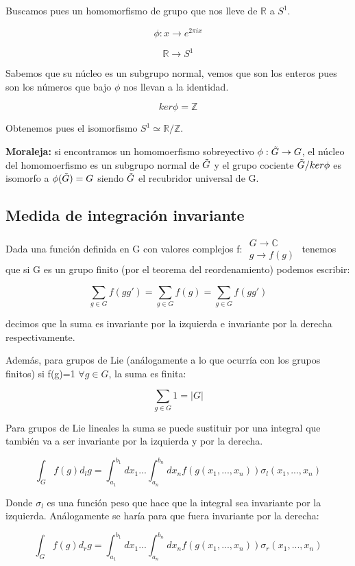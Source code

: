 \documentclass{article}
\begin{document}
\smallskip
Buscamos pues un homomorfismo de grupo que nos lleve de $\mathds{R}$ a $S^1$.

$$\phi: x \to e^{2\pi i x}$$

$$\mathds{R} \to S^1$$

Sabemos que su núcleo es un subgrupo normal, vemos que son los enteros pues son los números que bajo $\phi$ nos llevan a la identidad.

$$ker \phi = \mathds{Z}$$

Obtenemos pues el isomorfismo $S^1 \simeq \mathds{R} / \mathds{Z}$.

\textbf{Moraleja:} si encontramos un homomoerfismo sobreyectivo $\phi: \Tilde{G} \to G$, el núcleo del homomoerfismo es un subgrupo normal de $\Tilde{G}$ y el grupo cociente $\Tilde{G}/ker\phi$ es isomorfo a $\phi (\Tilde{G})=G$ siendo $\Tilde{ G}$ el recubridor universal de G.


\subsection{Medida de integración invariante}

Dada una función definida en G con valores complejos f: $\begin{array}{c}
G \to \mathds{C}  \\
g \to f(g)
\end{array}$ tenemos que si G es un grupo finito (por el teorema del reordenamiento) podemos escribir:

$$\sum _{g\in G} f(gg')=\sum _{g\in G} f(g)=\sum _{g\in G} f(gg')$$

decimos que la suma es invariante por la izquierda e invariante por la derecha respectivamente.

\smallskip
Además, para grupos de Lie (análogamente a lo que ocurría con los grupos finitos) si f(g)=1 $\forall g \in G$, la suma es finita:

$$\sum _{g \in G} 1 =|G|$$

Para grupos de Lie lineales la suma se puede sustituir por una integral que también va a ser invariante por la izquierda y por la derecha.

$$\int _G f(g)d_lg=\int ^{b_1}_{a_1} dx_1...\int ^{b_n}_{a_n} dx_n f(g(x_1,...,x_n))\sigma _l(x_1,...,x_n)$$

Donde $\sigma _l$ es una función peso que hace que la integral sea invariante por la izquierda. Análogamente se haría para que fuera invariante por la derecha:

$$\int _G f(g)d_rg=\int ^{b_1}_{a_1} dx_1...\int ^{b_n}_{a_n} dx_n f(g(x_1,...,x_n))\sigma _r(x_1,...,x_n)$$
\end{document}
